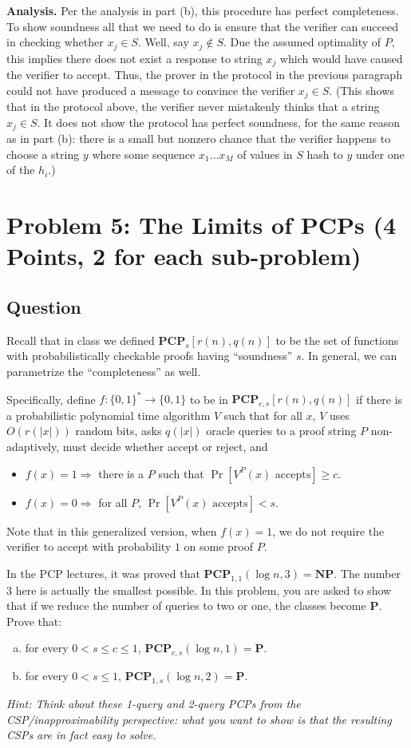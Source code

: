 \documentclass{article}
\newcommand{\mf}[1]{\mathbf{#1}}
\begin{document}
\medskip
\noindent
\textbf{Analysis.}
Per the analysis in part (b), this procedure has perfect completeness.
To show soundness all that we need to do is ensure that the verifier can succeed
in checking whether $x_j \in S$.
Well, say $x_j \notin S$.
Due the assumed optimality of $P$, this implies there does not exist a response to string $x_j$ which would have caused the verifier to accept.
Thus, the prover in the protocol in the previous paragraph could not have produced a message to convince the verifier $x_j \in S$.
(This shows that in the protocol above, the verifier never mistakenly thinks that a string $x_j \in S$.
It does not show the protocol has perfect soundness, for the same reason as in part (b): there
is a small but nonzero chance that the verifier happens to choose a string $y$ where some sequence $x_1 \dots x_M$ of values in $S$ hash to $y$ under one of the $h_i$.)

\newpage
\section*{Problem 5: The Limits of PCPs (4 Points, 2 for each sub-problem)}
\subsection*{Question}
Recall that in class we defined $\mf{PCP}_s[r(n),q(n)]$ to be the set of functions with probabilistically checkable proofs having ``soundness'' $s$. In general, we can parametrize the ``completeness'' as well. 

Specifically, define $f:\{0,1\}^* \rightarrow \{0,1\}$ to be in $\mf{PCP}_{c,s}[r(n),q(n)]$ if there is a probabilistic polynomial time algorithm $V$ such that for all $x$, $V$ uses $O(r(|x|))$ random bits, asks $q(|x|)$ oracle queries to a proof string $P$ non-adaptively, must decide whether accept or reject, and
\begin{itemize}
	\item
	$f(x) = 1 \Longrightarrow$ there is a $P$ such that $\Pr[V^P(x) \textrm{ accepts}] \geq c$.
	\item
	$f(x) = 0 \Longrightarrow$ for all $P$, $\Pr[V^P(x) \textrm{ accepts}] < s$.
\end{itemize}

Note that in this generalized version, when $f(x) = 1$, we do not require the verifier to accept with probability $1$ on some proof $P$. 

In the PCP lectures, it was proved that $\mf{PCP}_{1,1}(\log n, 3)=\mathbf{NP}$. The number $3$ here is actually the smallest possible. In this problem, you are asked to show that if we reduce the number of queries to two or one, the classes become $\mathbf{P}$. Prove that:
\begin{enumerate}[(a)]
	\item
	for every $0<s\leq  c\leq 1$, $\mf{PCP}_{c,s}(\log n,1)=\mathbf{P}$.
	\item
	for every $0<s\leq 1$, $\mf{PCP}_{1,s}(\log n,2)=\mathbf{P}$.
\end{enumerate} 
\emph{Hint: Think about these 1-query and 2-query PCPs from the CSP/inapproximability perspective: what you want to show is that the resulting CSPs are in fact easy to solve.}
\end{document}
